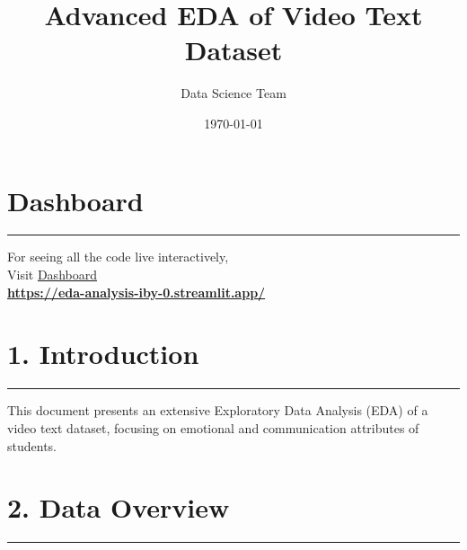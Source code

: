 \documentclass{article}
\title{\textcolor{primaryColor}{\Huge\textbf{Advanced EDA of Video Text Dataset}}}
\author{\textcolor{secondaryColor}{\Large Data Science Team}}
\date{\textcolor{secondaryColor}{\today}}
\begin{document}
\maketitle

\newpage
\section*{Dashboard}
  \begin{center}
        \color{red}\rule{1\linewidth}{1mm}
    \end{center}
\begin{center}
\vspace{2in}
    {\Huge  For seeing all the code live interactively, \\
    \vspace{2in}
    Visit  \href{https://eda-analysis-iby-0.streamlit.app/}{Dashboard}}\\
    
    \vspace{0.7in}
   \textbf{ \href{https://eda-analysis-iby-0.streamlit.app/}{https://eda-analysis-iby-0.streamlit.app/}}
\end{center}

\newpage
\tableofcontents

\newpage
\section{1. Introduction}
  \begin{center}
        \color{red}\rule{1\linewidth}{1mm}
    \end{center}
This document presents an extensive Exploratory Data Analysis (EDA) of a video text dataset, focusing on emotional and communication attributes of students.

\section{2. Data Overview}
  \begin{center}
        \color{red}\rule{1\linewidth}{1mm}
    \end{center}

   
\end{document}
